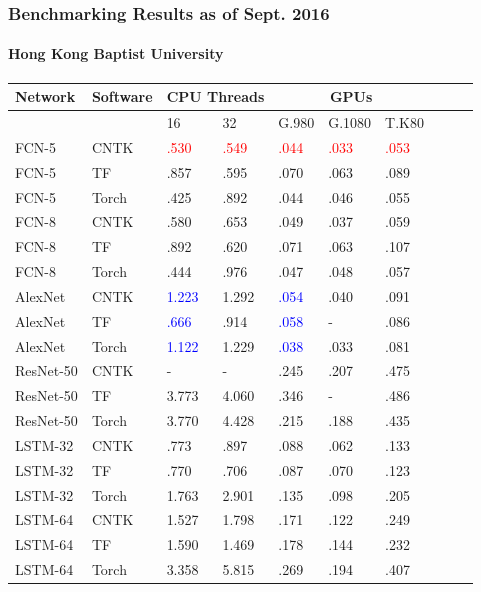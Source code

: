 \documentclass[9pt]{beamer}
\begin{document}
\begin{frame}
\frametitle{Benchmarking Results as of Sept. 2016}
\framesubtitle{Hong Kong Baptist University}
\begin{table}
\small
\begin{tabular}{ |l|l|l|l|l|l|l|l|l|l| }
  \hline
Network & Software & \multicolumn{2}{|c|}{CPU Threads} & \multicolumn{3}{|c|}{GPUs}  \\ \hline
 & & 16 & 32 & G.980 & G.1080 & T.K80 \\ \hline \hline
FCN-5 & CNTK  & \textcolor{red}{.530} & \textcolor{red}{.549} & \textcolor{red}{.044} & \textcolor{red}{.033} & \textcolor{red}{.053}\\
FCN-5 & TF  & .857 & .595 & .070 & .063 & .089\\
FCN-5 & Torch & .425 & .892 & .044 & .046 & .055 \\ \hline
FCN-8 & CNTK  & .580 & .653 & .049 & .037 & .059 \\
FCN-8 & TF  & .892 & .620 & .071 & .063  & .107\\
FCN-8 & Torch  & .444 & .976 & .047 & .048 & .057 \\ \hline \hline
AlexNet & CNTK  & \textcolor{blue}{1.223} & 1.292 & \textcolor{blue}{.054} & .040 & .091 \\
AlexNet & TF  & \textcolor{blue}{.666} & .914 & \textcolor{blue}{.058} & -  & .086\\
AlexNet & Torch  & \textcolor{blue}{1.122} & 1.229 & \textcolor{blue}{.038} & .033 & .081 \\ \hline
ResNet-50 & CNTK & - & - & .245 & .207 & .475\\
ResNet-50 & TF & 3.773 & 4.060 & .346 & - & .486 \\
ResNet-50 & Torch  & 3.770 & 4.428 & .215 & .188 & .435\\ \hline \hline
LSTM-32 & CNTK  & .773 & .897 & .088 & .062 & .133 \\
LSTM-32 & TF  & .770 & .706 & .087 & .070 & .123 \\
LSTM-32 & Torch  & 1.763 & 2.901 & .135 & .098 & .205 \\ \hline
LSTM-64 & CNTK  & 1.527 & 1.798 & .171 & .122 & .249 \\
LSTM-64 & TF  & 1.590 & 1.469 & .178 & .144 & .232 \\
LSTM-64 & Torch & 3.358 & 5.815 & .269 & .194 & .407 \\ \hline 
\end{tabular}
\end{table}
\end{frame}
\end{document}
